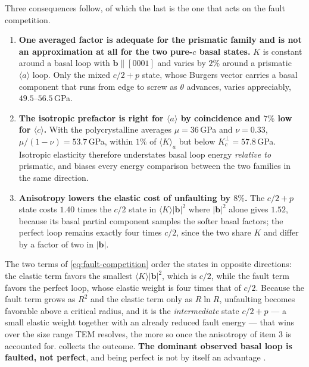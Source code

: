 \documentclass{article}
\newcommand{\aloop}{\ensuremath{\langle a\rangle}}
\newcommand{\cloop}{\ensuremath{\langle c\rangle}}
\newcommand{\bvec}{\bm b}
\begin{document}
Three consequences follow, of which the last is the one that acts on the fault
competition.
\begin{enumerate}
\item \textbf{One averaged factor is adequate for the prismatic family and is not
      an approximation at all for the two pure-$c$ basal states.} $K$ is constant
      around a basal loop with $\bvec\parallel[0001]$ and varies by $2\%$ around
      a prismatic \aloop{} loop. Only the mixed $c/2+p$ state, whose Burgers
      vector carries a basal component that runs from edge to screw as $\theta$
      advances, varies appreciably, $49.5$--$56.5\,$GPa.
\item \textbf{The isotropic prefactor is right for \aloop{} by coincidence and
      $7\%$ low for \cloop{}.} With the polycrystalline averages $\mu=36\,$GPa
      and $\nu=0.33$, $\mu/(1-\nu)=53.7\,$GPa, within $1\%$ of
      $\langle K\rangle_a$ but below $K^{\perp}_{c}=57.8\,$GPa. Isotropic
      elasticity therefore understates basal loop energy \emph{relative to}
      prismatic, and biases every energy comparison between the two families in
      the same direction.
\item \textbf{Anisotropy lowers the elastic cost of unfaulting by $8\%$.} The
      $c/2+p$ state costs $1.40$ times the $c/2$ state in
      $\langle K\rangle|\bvec|^{2}$ where $|\bvec|^{2}$ alone gives $1.52$,
      because its basal partial component samples the softer basal factors; the
      perfect loop remains exactly four times $c/2$, since the two share $K$ and
      differ by a factor of two in $|\bvec|$.
\end{enumerate}

The two terms of \cref{eq:fault-competition} order the states in opposite
directions: the elastic term favors the smallest $\langle K\rangle|\bvec|^2$,
which is $c/2$, while the fault term favors the perfect loop, whose elastic
weight is four times that of $c/2$. Because the fault term grows as $R^2$ and the
elastic term only as $R\ln R$, unfaulting becomes favorable above a critical
radius, and it is the \emph{intermediate} state $c/2+p$ --- a small elastic
weight together with an already reduced fault energy --- that wins over the size
range TEM resolves, the more so once the anisotropy of item 3 is accounted for.
 collects the outcome. \textbf{The dominant observed basal
loop is faulted, not perfect}, and being perfect is not by itself an advantage
\citep{varvenne2014vacancy,hulse2021atomistic}.
\end{document}
